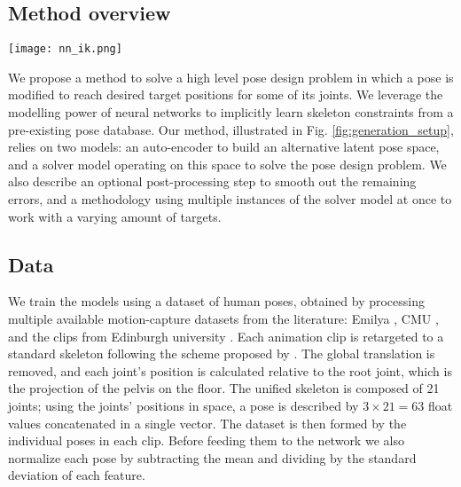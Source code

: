 \label{sect:proposed_method}
\subsection{Method overview}

\begin{figure*}[h]
    \centering
    \texttt{[image: nn\_ik.png]}
    \caption{High level overview of the generation setup. The target joint's positions (yellow) are matched as closely as possible, while the other joints (green) should be as close as possible to the starting pose (blue).}
    \label{fig:generation_setup}
\end{figure*}

We propose a method to solve a high level pose design problem in which a pose is modified to reach desired target positions for some of its joints. We leverage the modelling power of neural networks to implicitly learn skeleton constraints from a pre-existing pose database.
Our method, illustrated in Fig. \ref{fig:generation_setup}, relies on two models: an auto-encoder to build an alternative latent pose space, and a solver model operating on this space to solve the pose design problem. 
We also describe an optional post-processing step to smooth out the remaining errors, and  a methodology using multiple instances of the solver model at once to work with a varying amount of targets.

\subsection{Data}
\label{sect:materiel}
    
We train the models using a dataset of human poses, obtained by processing multiple available motion-capture datasets from the literature: Emilya \cite{fourati_emilya_2014}, CMU \cite{CMU_BVH}, and the clips from Edinburgh university \cite{holden_deep_2016}. Each animation clip is retargeted to a standard skeleton following the scheme proposed by \cite{HoldenAE2015}. The global translation is removed, and each joint's position is calculated relative to the root joint, which is the projection of the pelvis on the floor. The unified skeleton is composed of 21 joints; using the joints' positions in space, a pose is described by $ 3 \times 21 = 63 $ float values concatenated in a single vector. The dataset is then formed by the individual poses in each clip. Before feeding them to the network we also normalize each pose by subtracting the mean and dividing by the standard deviation of each feature. 

